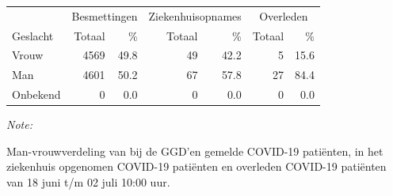 \documentclass[
  english,
  man,floatsintext]{apa6}
\begin{document}
\begin{table}
\centering\begingroup\fontsize{11}{13}\selectfont

\begin{threeparttable}
\begin{tabular}{lrrrrrr}
\toprule
\multicolumn{1}{c}{ } & \multicolumn{2}{c}{Besmettingen} & \multicolumn{2}{c}{Ziekenhuisopnames} & \multicolumn{2}{c}{Overleden} \\
\cmidrule(l{3pt}r{3pt}){2-3} \cmidrule(l{3pt}r{3pt}){4-5} \cmidrule(l{3pt}r{3pt}){6-7}
Geslacht & Totaal & \% & Totaal & \% & Totaal & \%\\
\midrule
Vrouw & 4569 & 49.8 & 49 & 42.2 & 5 & 15.6\\
Man & 4601 & 50.2 & 67 & 57.8 & 27 & 84.4\\
Onbekend & 0 & 0.0 & 0 & 0.0 & 0 & 0.0\\
\bottomrule
\end{tabular}
\begin{tablenotes}
\item \textit{Note: } 
\item Man-vrouwverdeling van bij de GGD’en gemelde COVID-19 patiënten, in het ziekenhuis opgenomen COVID-19 patiënten en overleden COVID-19 patiënten van 18 juni t/m 02 juli 10:00 uur.
\end{tablenotes}
\end{threeparttable}
\endgroup{}
\end{table}
\newpage
\end{document}
